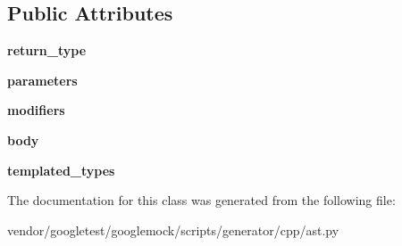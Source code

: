 \subsection*{Public Attributes}
\begin{DoxyCompactItemize}
\item 
{\bfseries return\+\_\+type}\hypertarget{classcpp_1_1ast_1_1Function_af750fd788d7ab33163ee066534780212}{}\label{classcpp_1_1ast_1_1Function_af750fd788d7ab33163ee066534780212}

\item 
{\bfseries parameters}\hypertarget{classcpp_1_1ast_1_1Function_a0e61ef47af9cf2fd4402dbd8cab631ef}{}\label{classcpp_1_1ast_1_1Function_a0e61ef47af9cf2fd4402dbd8cab631ef}

\item 
{\bfseries modifiers}\hypertarget{classcpp_1_1ast_1_1Function_ad30eed435f1ff9ff34ade9cc0d7be121}{}\label{classcpp_1_1ast_1_1Function_ad30eed435f1ff9ff34ade9cc0d7be121}

\item 
{\bfseries body}\hypertarget{classcpp_1_1ast_1_1Function_a8e25e5016b23b38e32acf2df529c0650}{}\label{classcpp_1_1ast_1_1Function_a8e25e5016b23b38e32acf2df529c0650}

\item 
{\bfseries templated\+\_\+types}\hypertarget{classcpp_1_1ast_1_1Function_a57bb03218bade3240137a0d91c467cb6}{}\label{classcpp_1_1ast_1_1Function_a57bb03218bade3240137a0d91c467cb6}

\end{DoxyCompactItemize}


The documentation for this class was generated from the following file\+:\begin{DoxyCompactItemize}
\item 
vendor/googletest/googlemock/scripts/generator/cpp/ast.\+py\end{DoxyCompactItemize}
